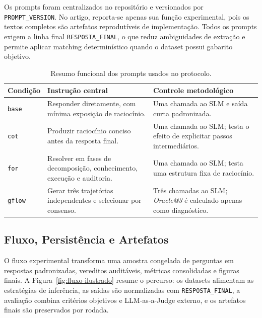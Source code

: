 \documentclass[12pt]{article}
\makeatletter
\newcommand{\oracle}{\mbox{\textit{Oracle@3}}}
\makeatother
\begin{document}
Os prompts foram centralizados no reposit\'orio e versionados por \texttt{PROMPT\_VERSION}. No artigo, reporta-se apenas sua fun\c{c}\~ao experimental, pois os textos completos s\~ao artefatos reprodut\'iveis de implementa\c{c}\~ao. Todos os prompts exigem a linha final \texttt{RESPOSTA\_FINAL}, o que reduz ambiguidades de extra\c{c}\~ao e permite aplicar matching determin\'istico quando o dataset possui gabarito objetivo.

\begin{table}[ht]
\centering
\small
\caption{Resumo funcional dos prompts usados no protocolo.}
\label{tab:prompts_resumo}
\begin{tabular}{|p{2.2cm}|p{5.4cm}|p{5.0cm}|}
\hline
\textbf{Condi\c{c}\~ao} & \textbf{Instru\c{c}\~ao central} & \textbf{Controle metodol\'ogico} \\
\hline
\texttt{base} & Responder diretamente, com m\'inima exposi\c{c}\~ao de racioc\'inio. & Uma chamada ao SLM e sa\'ida curta padronizada. \\
\hline
\texttt{cot} & Produzir racioc\'inio conciso antes da resposta final. & Uma chamada ao SLM; testa o efeito de explicitar passos intermedi\'arios. \\
\hline
\texttt{for} & Resolver em fases de decomposi\c{c}\~ao, conhecimento, execu\c{c}\~ao e auditoria. & Uma chamada ao SLM; testa uma estrutura fixa de racioc\'inio. \\
\hline
\texttt{gflow} & Gerar tr\^es trajet\'orias independentes e selecionar por consenso. & Tr\^es chamadas ao SLM; \oracle{} \'{e} calculado apenas como diagn\'ostico. \\
\hline
\end{tabular}
\end{table}

\subsection{Fluxo, Persistência e Artefatos}

O fluxo experimental transforma uma amostra congelada de perguntas em respostas padronizadas, vereditos auditáveis, métricas consolidadas e figuras finais. A Figura~\ref{fig:fluxo-ilustrado} resume o percurso: os datasets alimentam as estratégias de inferência, as saídas são normalizadas com \texttt{RESPOSTA\_FINAL}, a avaliação combina critérios objetivos e LLM-as-a-Judge externo, e os artefatos finais são preservados por rodada.
\end{document}
